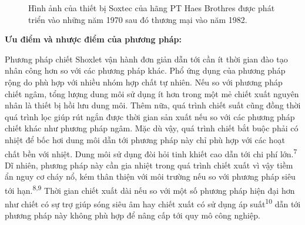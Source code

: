 \documentclass[
  twocolumn,
  landscape]{report}
\begin{document}
\begin{figure}


\caption{\label{fig-soxtec}Hình ảnh của thiết bị Soxtec của hãng PT Haes
Brothres được phát triển vào những năm 1970 sau đó thương mại vào năm
1982.}

\end{figure}%

\textbf{Ưu điểm và nhược điểm của phương pháp:}

Phương pháp chiết Shoxlet vận hành đơn giản dẫn tới cần ít thời gian đào
tạo nhân công hơn so với các phương pháp khác. Phổ ứng dụng của phương
pháp rộng do phù hợp với nhiều nhóm hợp chất tự nhiên. Nếu so với phương
pháp chiết ngâm, tổng lượng dung môi sử dụng ít hơn trong một mẻ chiết
xuất nguyên nhân là thiết bị hồi lưu dung môi. Thêm nữa, quá trình chiết
suất cũng đồng thời quá trình lọc giúp rút ngắn được thời gian sản xuất
nếu so với các phương pháp chiết khác như phương pháp ngâm. Mặc dù vậy,
quá trình chiết bắt buộc phải có nhiệt để bốc hơi dung môi dẫn tới
phương pháp này chỉ phù hợp với các hoạt chất bền với nhiệt. Dung môi sử
dụng đòi hỏi tinh khiết cao dẫn tới chi phí lớn.\textsuperscript{7} Dĩ
nhiên, phương pháp này cần gia nhiệt trong quá trình chiết xuất vì vậy
tiềm ẩn nguy cơ cháy nổ, kém thân thiện với môi trường nếu so với phương
pháp siêu tới hạn.\textsuperscript{8,9} Thời gian chiết xuất dài nếu so
với một số phương pháp hiện đại hơn như chiết có sự trợ giúp sóng siêu
âm hay chiết xuất có sử dụng áp suất\textsuperscript{10} dẫn tới phương
pháp này không phù hợp để nâng cấp tới quy mô công nghiệp.
\end{document}
